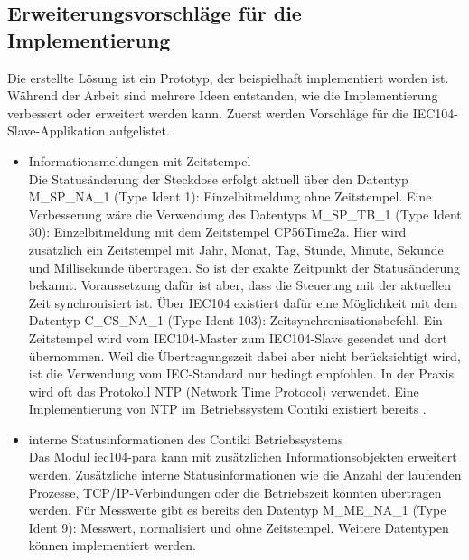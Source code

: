 \subsection{Erweiterungsvorschläge für die Implementierung}

Die erstellte Lösung ist ein Prototyp, der beispielhaft implementiert worden ist. Während der Arbeit sind mehrere Ideen entstanden, wie die Implementierung verbessert oder erweitert werden kann. Zuerst werden Vorschläge für die IEC104-Slave-Applikation aufgelistet.

\begin{itemize}
	\itemsep 0pt
	\item Informationsmeldungen mit Zeitstempel
	\\Die Statusänderung der Steckdose erfolgt aktuell über den Datentyp M\_SP\_NA\_1 (Type Ident 1): Einzelbitmeldung ohne Zeitstempel. Eine Verbesserung wäre die Verwendung des Datentyps M\_SP\_TB\_1 (Type Ident 30): Einzelbitmeldung mit dem Zeitstempel CP56Time2a. Hier wird zusätzlich ein Zeitstempel mit Jahr, Monat, Tag, Stunde, Minute, Sekunde und Millisekunde übertragen. So ist der exakte Zeitpunkt der Statusänderung bekannt. Voraussetzung dafür ist aber, dass die Steuerung mit der aktuellen Zeit synchronisiert ist. Über IEC104 existiert dafür eine Möglichkeit mit dem Datentyp C\_CS\_NA\_1 (Type Ident 103): Zeitsynchronisationsbefehl. Ein Zeitstempel wird vom IEC104-Master zum IEC104-Slave gesendet und dort übernommen. Weil die Übertragungszeit dabei aber nicht berücksichtigt wird, ist die Verwendung vom IEC-Standard nur bedingt empfohlen. In der Praxis wird oft das Protokoll NTP (Network Time Protocol) verwendet. Eine Implementierung von NTP im Betriebssystem Contiki existiert bereits \cite{Contiki-syslog}.
	\item interne Statusinformationen des Contiki Betriebssystems
	\\Das Modul iec104-para kann mit zusätzlichen Informationsobjekten erweitert werden. Zusätzliche interne Statusinformationen wie die Anzahl der laufenden Prozesse, TCP/IP-Verbindungen oder die Betriebszeit könnten übertragen werden. Für Messwerte gibt es bereits den Datentyp M\_ME\_NA\_1 (Type Ident 9): Messwert, normalisiert und ohne Zeitstempel. Weitere Datentypen können implementiert werden.
\end{itemize}

